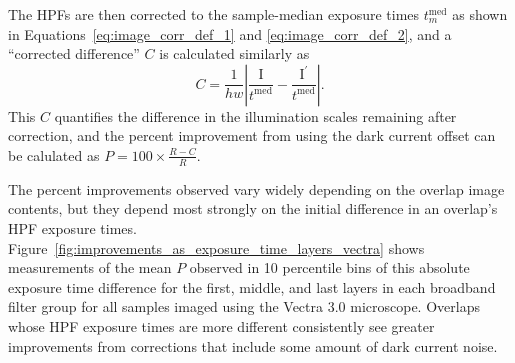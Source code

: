 \documentclass[letterpaper,11pt]{article}
\newcommand{\reffig}[1]{Figure~\ref{#1}}
\newcommand{\Iota}{\mathrm{I}}
\begin{document}
The HPFs are then corrected to the sample-median exposure times $t_{m}^{\mathrm{med}}$ as shown in Equations~\ref{eq:image_corr_def_1} and \ref{eq:image_corr_def_2}, and a ``corrected difference'' $C$ is calculated similarly as
\begin{equation}
C = \frac{1}{hw} \left| \frac{\Iota}{t^{\mathrm{med}}} - \frac{\Iota^{\prime}}{t^{\mathrm{med}}} \right| .
\end{equation}
This $C$ quantifies the difference in the illumination scales remaining after correction, and the percent improvement from using the dark current offset can be calulated as $P = 100 \times \frac{R-C}{R}$.

The percent improvements observed vary widely depending on the overlap image contents, but they depend most strongly on the initial difference in an overlap's HPF exposure times. \reffig{fig:improvements_as_exposure_time_layers_vectra} shows measurements of the mean $P$ observed in 10 percentile bins of this absolute exposure time difference for the first, middle, and last layers in each broadband filter group for all samples imaged using the Vectra 3.0 microscope. Overlaps whose HPF exposure times are more different consistently see greater improvements from corrections that include some amount of dark current noise.
\end{document}
